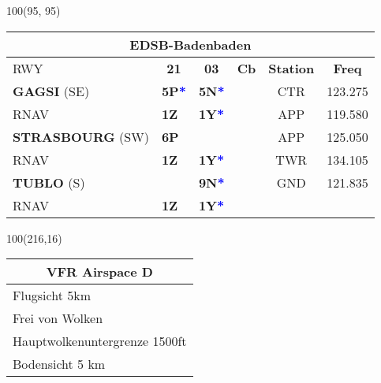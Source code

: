 \documentclass[10pt,landscape,a4paper]{article}
\begin{document}
\begin{textblock}{100}(95, 95)
\begin{table}[]
\begin{tabular}{|llllll}
\multicolumn{6}{c}{\textbf{EDSB-Badenbaden}} \\ \hline
\multicolumn{1}{|l|}{RWY} 									& \multicolumn{1}{c|}{\textbf{21}} 			& \multicolumn{1}{c|}{\textbf{03}}  				& \multicolumn{1}{c|}{\textbf{Cb}} 						& \multicolumn{1}{c|}{\textbf{Station}} 	& \multicolumn{1}{c|}{\textbf{Freq}}	\\ \hline
\multicolumn{1}{|l|}{\textbf{GAGSI} (SE)}							& \multicolumn{1}{l|}{\textbf{5P\textcolor{blue}{*}}}& \multicolumn{1}{l|}{\textbf{5N\textcolor{blue}{*}}} 	& \multicolumn{1}{c|}{\multirow{6}{*}{\rotatebox{90}{FL70}}}		& \multicolumn{1}{c|}{CTR}			& \multicolumn{1}{c|}{123.275}	\\ \cline{1-3}
\multicolumn{1}{|l|}{RNAV}									& \multicolumn{1}{l|}{\textbf{1Z} }			& \multicolumn{1}{l|}{\textbf{1Y\textcolor{blue}{*}}}	& \multicolumn{1}{c|}{}  								& \multicolumn{1}{c|}{APP}			& \multicolumn{1}{c|}{119.580}	\\ \cline{1-3}

\multicolumn{1}{|l|}{\textbf{STRASBOURG} (SW)} 						& \multicolumn{1}{l|}{\textbf{6P}} 			& \multicolumn{1}{l|}{\textbf{}}					& \multicolumn{1}{c|}{} 								& \multicolumn{1}{c|}{APP} 			& \multicolumn{1}{c|}{125.050}	\\ \cline{1-3}
\multicolumn{1}{|l|}{RNAV}									& \multicolumn{1}{l|}{\textbf{1Z}}			& \multicolumn{1}{l|}{\textbf{1Y\textcolor{blue}{*}}}		& \multicolumn{1}{c|}{} 							& \multicolumn{1}{c|}{TWR}			& \multicolumn{1}{c|}{134.105}		\\ \cline{1-3} 

\multicolumn{1}{|l|}{\textbf{TUBLO} (S)} 							& \multicolumn{1}{l|}{}					& \multicolumn{1}{l|}{\textbf{9N\textcolor{blue}{*}}}	& \multicolumn{1}{c|}{}								& \multicolumn{1}{c|}{GND}			& \multicolumn{1}{c|}{121.835} 	\\\cline{1-3} \cline{5-6}
\multicolumn{1}{|l|}{RNAV} 									& \multicolumn{1}{l|}{\textbf{1Z}} 			& \multicolumn{1}{l|}{\textbf{1Y\textcolor{blue}{*}}}	& \multicolumn{1}{c|}{}  								& \multicolumn{2}{c|}{}	\\ \hline
\end{tabular}
\end{table}
\end{textblock}

\begin{textblock}{100}(216,16)
\begin{table}[]
\begin{tabular}{|l|}
\multicolumn{1}{c}{\textbf{VFR Airspace D}} \\ \hline
 Flugsicht 5km   \\ \hline
Frei von Wolken   \\ \hline
Hauptwolkenuntergrenze 1500ft \\ \hline
Bodensicht 5 km \\ \hline
\end{tabular}
\end{table}
\end{textblock}
\end{document}
